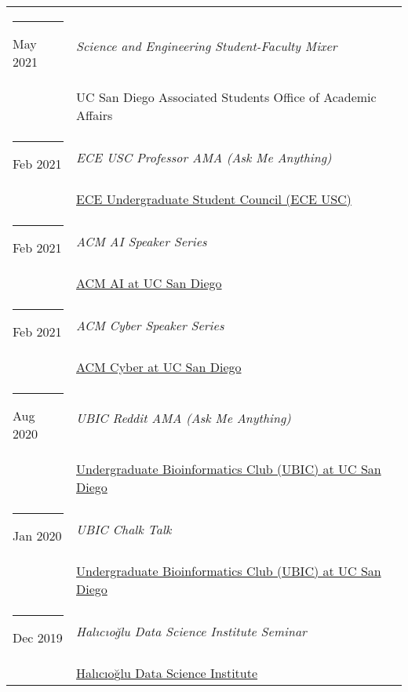 \documentclass[margin,line]{res}
\begin{document}
\begin{resume}
\begin{longtable}{@{}p{0.7in}p{4in}}
\hspace*{-4mm} \rule{-1mm}{5mm} May 2021 & \textit{Science and Engineering Student-Faculty Mixer}\\*
\hspace*{-4mm} & \hspace{4mm} UC San Diego Associated Students Office of Academic Affairs\\
\hspace*{-4mm} \rule{-1mm}{5mm} Feb 2021 & \textit{ECE USC Professor AMA (Ask Me Anything)}\\*
\hspace*{-4mm} & \hspace{4mm} \href{https://eceusc.ucsd.edu/}{ECE Undergraduate Student Council (ECE USC)}\\
\hspace*{-4mm} \rule{-1mm}{5mm} Feb 2021 & \textit{ACM AI Speaker Series}\\*
\hspace*{-4mm} & \hspace{4mm} \href{https://ai.acmucsd.com/}{ACM AI at UC San Diego}\\
\hspace*{-4mm} \rule{-1mm}{5mm} Feb 2021 & \textit{ACM Cyber Speaker Series}\\*
\hspace*{-4mm} & \hspace{4mm} \href{https://www.facebook.com/cyberucsd}{ACM Cyber at UC San Diego}\\
\hspace*{-4mm} \rule{-1mm}{5mm} Aug 2020 & \textit{UBIC Reddit AMA (Ask Me Anything)}\\*
\hspace*{-4mm} & \hspace{4mm} \href{http://ubicucsd.github.io/}{Undergraduate Bioinformatics Club (UBIC) at UC San Diego}\\
\hspace*{-4mm} \rule{-1mm}{5mm} Jan 2020 & \textit{UBIC Chalk Talk}\\*
\hspace*{-4mm} & \hspace{4mm} \href{http://ubicucsd.github.io/}{Undergraduate Bioinformatics Club (UBIC) at UC San Diego}\\
\hspace*{-4mm} \rule{-1mm}{5mm} Dec 2019 & \textit{Hal{\i}c{\i}o{\u g}lu Data Science Institute Seminar}\\*
\hspace*{-4mm} & \hspace{4mm} \href{https://datascience.ucsd.edu/}{Hal{\i}c{\i}o{\u g}lu Data Science Institute}\\

\end{longtable}
\end{resume}
\end{document}
